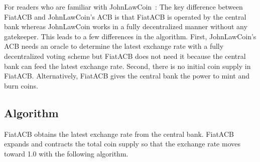 \documentclass[dvipdfmx,a4paper]{article}
\begin{document}
For readers who are familiar with JohnLawCoin~\cite{johnlawcoin}: The key difference between FiatACB and JohnLawCoin's ACB is that FiatACB is operated by the central bank whereas JohnLawCoin works in a fully decentralized manner without any gatekeeper. This leads to a few differences in the algorithm. First, JohnLawCoin's ACB needs an oracle to determine the latest exchange rate with a fully decentralized voting scheme but FiatACB does not need it because the central bank can feed the latest exchange rate. Second, there is no initial coin supply in FiatACB. Alternatively, FiatACB gives the central bank the power to mint and burn coins.

\subsection{Algorithm}

FiatACB obtains the latest exchange rate from the central bank. FiatACB expands and contracts the total coin supply so that the exchange rate moves toward 1.0 with the following algorithm.
\end{document}
